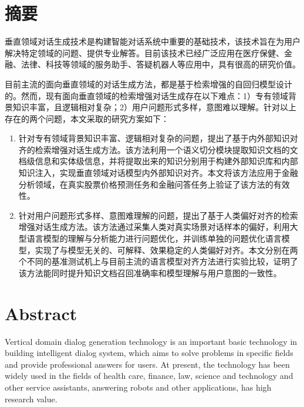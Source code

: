 \chapter{摘\texorpdfstring{\quad}{}要}

垂直领域对话生成技术是构建智能对话系统中重要的基础技术，该技术旨在为用户解决特定领域的问题、提供专业解答。目前该技术已经广泛应用在医疗保健、金融、法律、科技等领域的服务助手、答疑机器人等应用中，具有很高的研究价值。

目前主流的面向垂直领域的对话生成方法，都是基于检索增强的自回归模型设计的。然而，现有面向垂直领域的检索增强对话生成存在以下难点：1）专有领域背景知识丰富，且逻辑相对复杂；2）用户问题形式多样，意图难以理解。针对以上存在的两个问题，本文采取的研究方案如下：

\begin{enumerate}[topsep = 0 pt, itemsep= 0 pt, parsep=0pt, partopsep=0pt, leftmargin=0pt, itemindent=44pt, labelsep=6pt, listparindent=24pt, label=\arabic*)]
	\item 针对专有领域背景知识丰富、逻辑相对复杂的问题，提出了基于内外部知识对齐的检索增强对话生成方法。该方法利用一个语义切分模块提取知识文档的文档级信息和实体级信息，并将提取出来的知识分别用于构建外部知识库和内部知识注入，实现垂直领域对话模型内外部知识对齐。本文将该方法应用于金融分析领域，在真实股票价格预测任务和金融问答任务上验证了该方法的有效性。

	\item 针对用户问题形式多样、意图难理解的问题，提出了基于人类偏好对齐的检索增强对话生成方法。该方法通过采集人类对真实场景对话样本的偏好，利用大型语言模型的理解与分析能力进行问题优化，并训练单独的问题优化语言模型，实现了与模型无关的、可解释、效果稳定的人类偏好对齐。本文分别在两个不同的基准测试机上与目前主流的语言模型对齐方法进行实验比较，证明了该方法能同时提升知识文档召回准确率和模型理解与用户意图的一致性。
\end{enumerate}


\chapter{Abstract}

Vertical domain dialog generation technology is an important basic technology in building intelligent dialog system, which aims to solve problems in specific fields and provide professional answers for users. At present, the technology has been widely used in the fields of health care, finance, law, science and technology and other service assistants, answering robots and other applications, has high research value.


